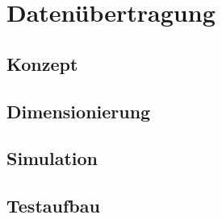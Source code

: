 \section{Datenübertragung}

\subsection{Konzept}

\subsection{Dimensionierung}

\subsection{Simulation}

\subsection{Testaufbau}
